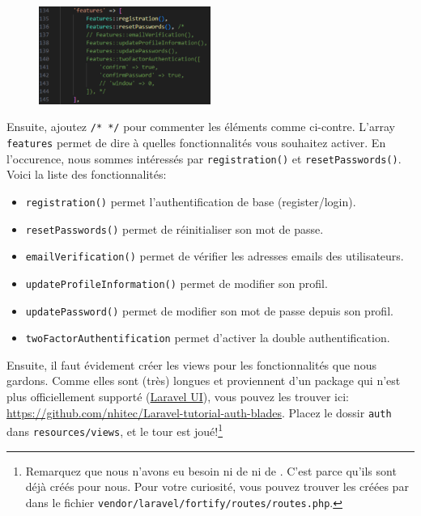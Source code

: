 \documentclass[internal]{nhitec_design}
\begin{document}
\begin{figure}
    \vspace{-0.5cm}
    \includegraphics[width=0.5\textwidth]{figures-C1/config_fortify.pdf}
\end{figure}

Ensuite, ajoutez \verb|/* */| pour commenter les éléments comme ci-contre. L'array \verb|features| permet de dire à \fortify{} quelles fonctionnalités vous souhaitez activer. En l'occurence, nous sommes intéressés par \verb|registration()| et \verb|resetPasswords()|. Voici la liste des fonctionnalités:

\begin{itemize}
    \item \verb|registration()| permet l'authentification de base (register/login).
    \item \verb|resetPasswords()| permet de réinitialiser son mot de passe.
\end{itemize}

\begin{itemize}[resume, before = \vspace*{-0.63cm}]
    \item \verb|emailVerification()| permet de vérifier les adresses emails des utilisateurs.
    \item \verb|updateProfileInformation()| permet de modifier son profil.
    \item \verb|updatePassword()| permet de modifier son mot de passe depuis son profil. 
    \item \verb|twoFactorAuthentification| permet d'activer la double authentification.
\end{itemize}

\newpage

Ensuite, il faut évidement créer les views pour les fonctionnalités que nous gardons. Comme elles sont (très) longues et proviennent d'un package qui n'est plus officiellement supporté (\href{https://github.com/laravel/ui}{Laravel UI}), vous pouvez les trouver ici: \url{https://github.com/nhitec/Laravel-tutorial-auth-blades}. Placez le dossir \verb|auth| dans \verb|resources/views|, et le tour est joué!\footnote{Remarquez que nous n'avons eu besoin ni de \controllers{} ni de \routes{}. C'est parce qu'ils sont déjà créés pour nous. Pour votre curiosité, vous pouvez trouver les \routes{} créées par \fortify{} dans le fichier \verb|vendor/laravel/fortify/routes/routes.php|.}
\end{document}
